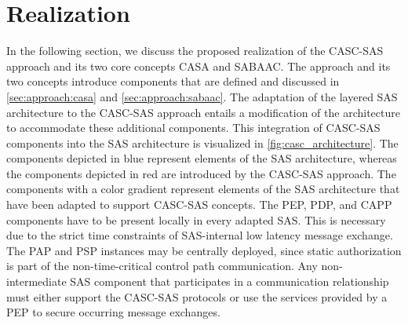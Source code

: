 \section{Realization}
\label{sec:approach:realization}
In the following section, we discuss the proposed realization of the CASC-SAS approach and its two core concepts CASA and SABAAC.
The approach and its two concepts introduce components that are defined and discussed in \autoref{sec:approach:casa} and \autoref{sec:approach:sabaac}.
The adaptation of the layered SAS architecture to the CASC-SAS approach entails a modification of the architecture to accommodate these additional components.
This integration of CASC-SAS components into the SAS architecture is visualized in \autoref{fig:casc_architecture}.
The components depicted in blue represent elements of the SAS architecture, whereas the components depicted in red are introduced by the CASC-SAS approach.
The components with a color gradient represent elements of the SAS architecture that have been adapted to support CASC-SAS concepts.
The PEP, PDP, and CAPP components have to be present locally in every adapted SAS.
This is necessary due to the strict time constraints of SAS-internal low latency message exchange.
The PAP and PSP instances may be centrally deployed, since static authorization is part of the non-time-critical control path communication.
Any non-intermediate SAS component that participates in a communication relationship must either support the CASC-SAS protocols or use the services provided by a PEP to secure occurring message exchanges.
